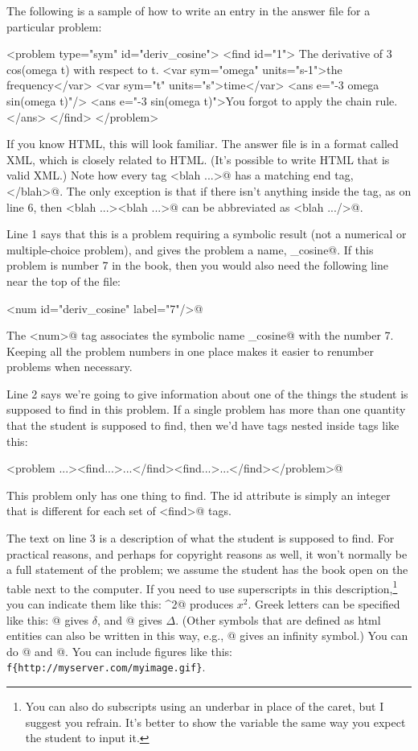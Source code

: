 \documentclass{doc}
\begin{document}
\label{answerfile}
The following is a sample of how to write an entry in the answer file
for a particular problem:
\begin{listing}{1}
<problem type="sym" id="deriv_cosine">
  <find id="1">
    The derivative of 3 cos(omega t) with respect to t.
    <var sym="omega" units="s-1">the frequency</var>
    <var sym="t" units="s">time</var>
    <ans  e="-3 omega sin(omega t)"/>
    <ans e="-3 sin(omega t)">You forgot to apply the chain rule.</ans>
  </find>
</problem>
\end{listing}

If you know HTML, this will look familiar. The answer file is in a format
called XML, which is closely related to HTML. (It's possible to write HTML
that is valid XML.) Note how every tag \verb@<blah ...>@ has a matching
end tag, \verb@</blah>@. The only exception is that if there isn't anything inside
the tag, as on line 6, then \verb@<blah ...><blah ...>@ can be abbreviated as
\verb@<blah .../>@. 

Line 1 says that this is a problem requiring a symbolic result (not a numerical
or multiple-choice problem), and gives the problem a name, \verb@deriv_cosine@.
If this problem is number 7 in the book, then you would also
need the following line near the top of the file:

\noindent\verb@<num id="deriv_cosine" label="7"/>@

The \verb@<num>@ tag associates the symbolic name \verb@deriv_cosine@
with the number 7. Keeping all the problem numbers in one place
makes it easier to renumber problems when necessary.

Line 2 says we're going to give information about one of the things
the student is supposed to find in this problem. If a single problem has
more than one quantity that the student is supposed to find, then we'd
have \verb@find@ tags nested inside \verb@problem@ tags like this:

\noindent\verb@<problem ...><find...>...</find><find...>...</find></problem>@

This problem only has one thing to find. The id attribute is simply an integer
that is different for each set of \verb@<find>@ tags.

The text on line 3 is a description of what the student is supposed to find.
For practical reasons, and perhaps for copyright reasons as well, it won't
normally be a full statement of the problem; we assume the student has the
book open on the table next to the computer. If you need to use 
superscripts in this description,\footnote{You can also do subscripts using an underbar in place
of the caret,
but I suggest you refrain. It's
better to show the variable the same way you expect the student to input it.}
 you can indicate them like this:
\verb@x^{2}@ produces $x^2$. Greek letters can
be specified like this: @ gives $\delta$, and @ gives $\Delta$.
(Other symbols that are defined as html entities can also be written in this way, e.g.,
@ gives an infinity symbol.)
You can do @ and @.
You can include figures like this: \verb|f{http://myserver.com/myimage.gif}|.
\end{document}
